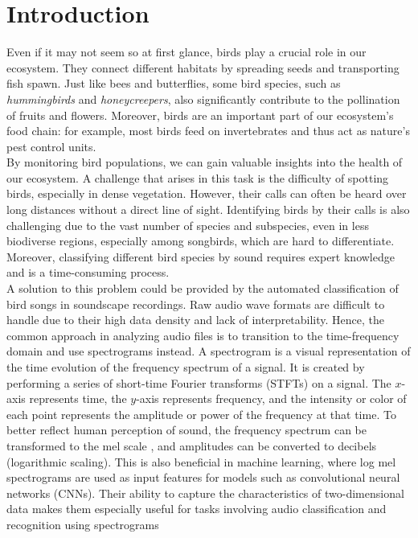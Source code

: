 \section{Introduction}
\label{sec:introduction}
Even if it may not seem so at first glance, birds play a crucial role in our ecosystem. They connect different habitats by spreading seeds and transporting fish spawn. 
Just like bees and butterflies, some bird species, such as \textit{hummingbirds} and \textit{honeycreepers}, also significantly contribute to the pollination of fruits and flowers. 
Moreover, birds are an important part of our ecosystem's food chain: for example, most birds feed on invertebrates and thus act as nature's pest control units. \\
By monitoring bird populations, we can gain valuable insights into the health of our ecosystem.
A challenge that arises in this task is the difficulty of spotting birds, especially in dense vegetation.
However, their calls can often be heard over long distances without a direct line of sight.
Identifying birds by their calls is also challenging due to the vast number of species and subspecies, even in less biodiverse regions, especially among songbirds, 
which are hard to differentiate.
Moreover, classifying different bird species by sound requires expert knowledge and is a time-consuming process. \\
A solution to this problem could be provided by the automated classification of bird songs in soundscape recordings. Raw audio wave formats are difficult to handle due to their high data 
density and lack of interpretability. Hence, the common approach in analyzing audio files is to transition to the time-frequency domain and use 
spectrograms instead. 
A spectrogram is a visual representation of the time evolution of the frequency spectrum of a signal. It is created by performing a series of short-time Fourier transforms (STFTs)
\cite{Cohen1964} on a signal. The $x$-axis represents time, the $y$-axis represents frequency, and the intensity or color of each point represents the amplitude or power of the 
frequency at that time. To better reflect human perception of sound, the frequency spectrum can be transformed to the mel scale \cite{Stevens1937}, and amplitudes can be 
converted to decibels (logarithmic scaling). 
This is also beneficial in machine learning, where log mel spectrograms are used as input features for models such as convolutional neural networks (CNNs). 
Their ability to capture the characteristics of two-dimensional data makes them especially useful for tasks involving audio classification and recognition using spectrograms 
